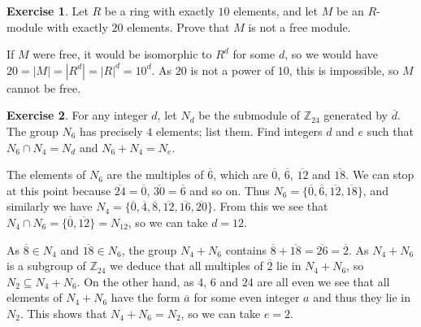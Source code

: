 \documentclass{amsart}
\newcommand{\Z}         {{\mathbb{Z}}}
\newcommand{\ov}[1]     {\overline{#1}}
\newcommand{\sse}       {\subseteq}
\newcommand{\ip}[1]     {\langle #1\rangle}
\renewcommand{\:}{\colon}
\theoremstyle{definition}
\newtheorem{exercise}{Exercise}[section]
\renewenvironment{solution}{\SolutionAtEnd}{\endSolutionAtEnd}
\begin{document}
\begin{exercise}
 Let $R$ be a ring with exactly $10$ elements, and let $M$ be an
 $R$-module with exactly $20$ elements.  Prove that $M$ is not a free
 module.  
\end{exercise}
\begin{solution}
 If $M$ were free, it would be isomorphic to $R^d$ for some $d$, so we
 would have $20=|M|=|R^d|=|R|^d=10^d$.  As $20$ is not a power of
 $10$, this is impossible, so $M$ cannot be free.
\end{solution}

\begin{exercise}
 For any integer $d$, let $N_d$ be the submodule of $\Z_{24}$
 generated by $\ov{d}$.  The group $N_6$ has precisely $4$ elements;
 list them.  Find integers $d$ and $e$ such that
 $N_6\cap N_4=N_d$ and $N_6+N_4=N_e$.
\end{exercise}
\begin{solution}
 The elements of $N_6$ are the multiples of $\ov{6}$, which are
 $\ov{0}$, $\ov{6}$, $\ov{12}$ and $\ov{18}$.  We can stop at this
 point because $\ov{24}=\ov{0}$, $\ov{30}=\ov{6}$ and so on.  Thus
 $N_6=\{\ov{0},\ov{6},\ov{12},\ov{18}\}$, and similarly we have
 $N_4=\{\ov{0},\ov{4},\ov{8},\ov{12},\ov{16},\ov{20}\}$.  From this we
 see that $N_4\cap N_6=\{\ov{0},\ov{12}\}=N_{12}$, so we can take
 $d=12$.  

 As $\ov{8}\in N_4$ and $\ov{18}\in N_6$, the group $N_4+N_6$ contains
 $\ov{8}+\ov{18}=\ov{26}=\ov{2}$.  As $N_4+N_6$ is a subgroup of
 $\Z_{24}$ we deduce that all multiples of $\ov{2}$ lie in $N_4+N_6$,
 so $N_2\sse N_4+N_6$.  On the other hand, as $4$, $6$ and $24$ are
 all even we see that all elements of $N_4+N_6$ have the form $\ov{a}$
 for some even integer $a$ and thus they lie in $N_2$.  This shows
 that $N_4+N_6=N_2$, so we can take $e=2$.
\end{solution}
\end{document}
